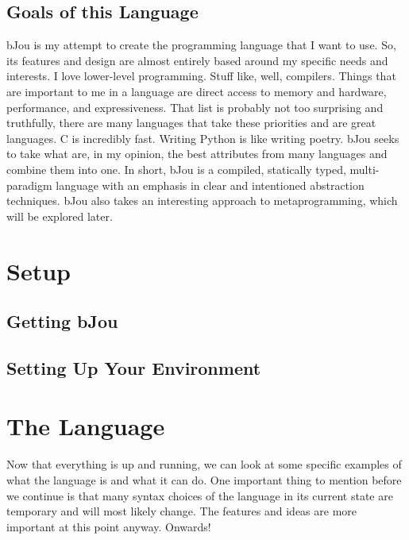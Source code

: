 \documentclass[12pt]{article}
\begin{document}
	\subsection*{Goals of this Language}
		bJou is my attempt to create the programming language that I want to use. So, its features and design are almost entirely based around my specific needs and interests. I love lower-level programming. Stuff like, well, compilers. Things that are important to me in a language are direct access to memory and hardware, performance, and expressiveness. That list is probably not too surprising and truthfully, there are many languages that take these priorities and are great languages. C is incredibly fast. Writing Python is like writing poetry. bJou seeks to take what are, in my opinion, the best attributes from many languages and combine them into one. In short, bJou is a compiled, statically typed, multi-paradigm language with an emphasis in clear and intentioned abstraction techniques. bJou also takes an interesting approach to metaprogramming, which will be explored later.
	
\section*{Setup}

	\subsection*{Getting bJou}
	
	\subsection*{Setting Up Your Environment}

\section*{The Language}

Now that everything is up and running, we can look at some specific examples of what the language is and what it can do. One important thing to mention before we continue is that many syntax choices of the language in its current state are temporary and will most likely change. The features and ideas are more important at this point anyway. Onwards!
\end{document}
